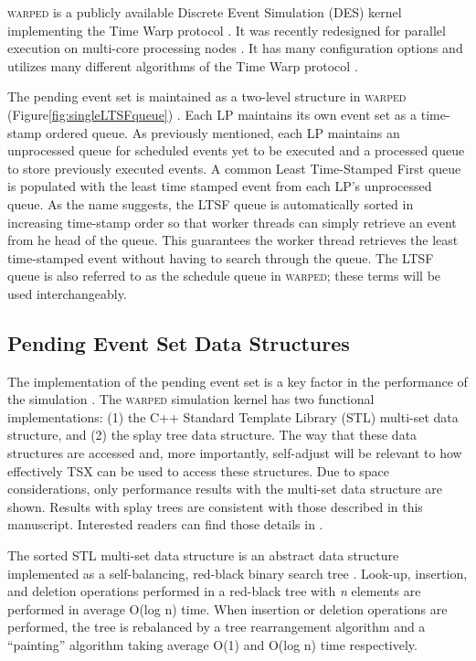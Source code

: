 \documentclass{sig-alternate}
\begin{document}
\textsc{warped} is a publicly available Discrete Event Simulation (DES) kernel
implementing the Time Warp protocol \cite{martin,fujimoto}.  It was recently redesigned
for parallel execution on multi-core processing nodes \cite{muthalagu}.  It has many
configuration options and utilizes many different algorithms of the Time Warp protocol
\cite{fujimoto}.

The pending event set is maintained as a two-level structure in \textsc{warped}
(Figure\ref{fig:singleLTSFqueue}) \cite{dickman}.  Each LP maintains its own event set as
a time-stamp ordered queue.  As previously mentioned, each LP maintains an unprocessed
queue for scheduled events yet to be executed and a processed queue to store previously
executed events.  A common Least Time-Stamped First queue is populated with the least time
stamped event from each LP's unprocessed queue.  As the name suggests, the LTSF queue is
automatically sorted in increasing time-stamp order so that worker threads can simply
retrieve an event from he head of the queue.  This guarantees the worker thread retrieves
the least time-stamped event without having to search through the queue. The LTSF queue is
also referred to as the schedule queue in \textsc{warped}; these terms will be used
interchangeably.  

\subsection{Pending Event Set Data Structures}

The implementation of the pending event set is a key factor in the performance of the
simulation \cite{twpes}.  The \textsc{warped} simulation kernel has two functional
implementations: (1) the C++ Standard Template Library (STL) multi-set data structure, and
(2) the splay tree data structure.  The way that these data structures are accessed and,
more importantly, self-adjust will be relevant to how effectively TSX can be used to
access these structures.  Due to space considerations, only performance results with the
multi-set data structure are shown.  Results with splay trees are consistent with those
described in this manuscript.  Interested readers can find those details in \cite{hay-14}.

The sorted STL multi-set data structure is an abstract data structure implemented as a
self-balancing, red-black binary search tree \cite{redblack}.  Look-up, insertion, and
deletion operations performed in a red-black tree with \emph{n} elements are performed in
average O(log n) time.  When insertion or deletion operations are performed, the tree is
rebalanced by a tree rearrangement algorithm and a ``painting'' algorithm taking average
O(1) and O(log n) time respectively.
\end{document}
